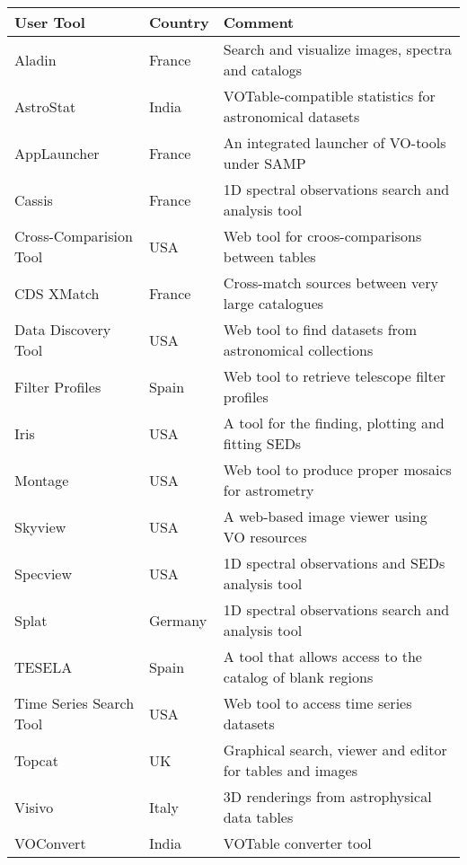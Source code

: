\begin{table}[ht!]
	\centering
   \scriptsize
	\begin{tabular}{|l|l|l|}
	\hline
	\textbf{User Tool} & \textbf{Country} &  \textbf{Comment}\\
	\hline								 
  Aladin & France & Search and visualize images, spectra and catalogs\\
	\hline
  AstroStat & India & VOTable-compatible statistics for astronomical datasets\\
	\hline								 
  AppLauncher & France & An integrated launcher of VO-tools under SAMP \\
	\hline								 
  Cassis & France & 1D spectral observations search and analysis tool  \\
	\hline								 
  Cross-Comparision Tool & USA & Web tool for croos-comparisons between tables\\
	\hline								 
  CDS XMatch & France & Cross-match sources between very large catalogues \\
	\hline								 
  Data Discovery Tool & USA & Web tool to find datasets from astronomical collections\\
	\hline								 
  Filter Profiles & Spain & Web tool to retrieve telescope filter profiles \\
  \hline
  Iris & USA & A tool for the finding, plotting and fitting SEDs \\
  \hline
  Montage & USA & Web tool to produce proper mosaics for astrometry \\
  \hline
  Skyview & USA & A web-based image viewer using VO resources\\
	\hline								 
  Specview & USA & 1D spectral observations and SEDs analysis tool \\
  \hline
  Splat & Germany & 1D spectral observations search and analysis tool \\
	\hline								 
  TESELA & Spain & A tool that allows access to the catalog of blank regions\\
  \hline								 
  Time Series Search Tool & USA & Web tool to access time series datasets \\
  \hline								 
  Topcat & UK & Graphical search, viewer and editor for tables and images\\
  \hline								 
  Visivo & Italy & 3D renderings from astrophysical data tables \\
  \hline								 
  VOConvert & India & VOTable converter tool \\

\end{tabular}
\end{table}

